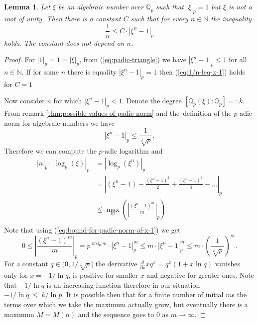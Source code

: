 \documentclass[12pt, a4paper]{amsart}
\def\Q{{\mathbb Q}}
\def\ln{\operatorname{ln}}
\def\ord{\operatorname{ord}}
\newtheorem{lemma}[theorem]{Lemma}
\def\N{{\mathbb N}}
\begin{document}
\begin{lemma}\label{thm:padic-log-geq-1/n}
  Let $\xi$ be an algebraic number over $\Q_p$ such that $|\xi|_p = 1$ but $\xi$ is not a root of unity.
  Then there is a constant $C$ such that for every $n \in \N$ the inequality
  \begin{equation}\label{eq:1/n-leq-x-1}
    \frac{1}{n} \leq C \cdot \left| \xi^n - 1 \right|_p
  \end{equation}
  holds. The constant does not depend on $n$.
\end{lemma}
\begin{proof}
  For $|1|_p = 1 = |\xi|_p$, from (\ref{eq:padic-triangle}) we have $|\xi^n-1|_p \leq 1$ for all $n \in \N$.
  If for some $n$ there is equality $|\xi^n-1|_p = 1$ then (\ref{eq:1/n-leq-x-1}) holds for $C=1$

  Now consider $n$ for which $|\xi^n-1|_p < 1$.
  Denote the degree $\left[ \Q_p(\xi) : \Q_p \right] =: k$.
  From remark \ref{thm:possible-values-of-padic-norm} and
  the~definition of the $p$-adic norm for algebraic numbers we have
  \begin{equation}\label{eq:bound-for-padic-norm-of-x-1}
      |\xi^n-1|_p \leq \frac{1}{\sqrt[k]{p}}.
  \end{equation}
  Therefore we can compute the $p$-adic logarithm and
  \begin{align*}
    |n|_p \cdot |\log_p (\xi)|_p &= |\log_p (\xi^n)|_p \\
    &= \left|(\xi^n - 1) - \frac{(\xi^n - 1)^2}{2} + \frac{(\xi^n - 1)^3}{3} - \dots \right|_p \\
    &\leq \max_m \left( \left|\frac{(\xi^n - 1)^m}{m} \right|_p \right) \\
  \end{align*}
  Note that using (\ref{eq:bound-for-padic-norm-of-x-1}) we get
  \begin{equation}\label{eq:padic-maximum-term}
    0 \leq \left| \frac{(\xi^n - 1)^m}{m} \right|_p
    = p^{\ord_p m} \cdot \left| \xi^n - 1 \right|_p^m
    \leq m \cdot \left| \xi^n - 1 \right|_p^m
    \leq m \cdot \left( \frac{1}{\sqrt[k]{p}} \right)^m.
  \end{equation}
  For a constant $q \in (0, 1/\sqrt[k]{p}]$ the derivative
  $\frac{\partial}{\partial x} xq^x = q^x(1+x\ln q)$ vanishes only for
  $x = -1/\ln q$, is positive for smaller $x$ and negative for greater ones.
  Note that $-1/\ln q$ is an increasing function therefore in our situation $-1/\ln q \ \leq \ k/\ln p$.
  It is possible then that for a finite number of initial $m$s the terms over which we take the maximum
  actually grow, but eventually there is a maximum $M = M(n)$ and the sequence goes to $0$ as $m \to \infty$.


\end{proof}
\end{document}
